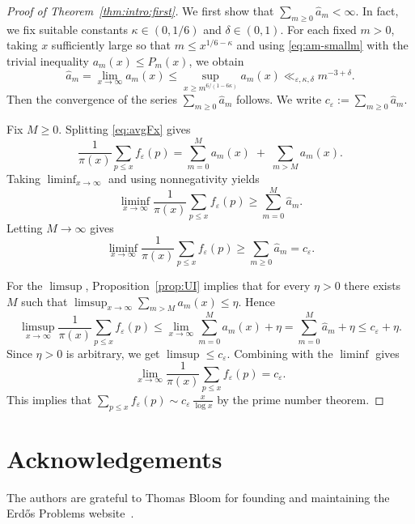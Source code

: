\documentclass[11pt,letterpaper,reqno]{amsart}
\theoremstyle{definition}
\numberwithin{equation}{section}
\newcommand{\eps}{\varepsilon}
\newcommand{\1}{\mathbf{1}}
\begin{document}
\begin{proof}[Proof of Theorem~\ref{thm:intro:first}]
We first show that $\sum_{m\ge 0} \widehat{a}_m<\infty$. In fact, we fix suitable constants $\kappa\in(0,1/6)$ and $\delta\in(0,1)$. For each fixed $m>0$, taking $x$ sufficiently large so that
$m\le x^{1/6-\kappa}$ and using \eqref{eq:am-smallm} with the trivial inequality $a_m(x)\leq P_m(x)$, we obtain
\[
\widehat{a}_m=\lim_{x\to\infty}a_m(x)\le \sup_{x\ge m^{6/(1-6\kappa)}} a_m(x)\ll_{\eps,\kappa,\delta} m^{-3+\delta}.
\]
Then the convergence of the series $\sum_{m\ge 0} \widehat{a}_m$ follows. We write $c_\eps :=\sum_{m\ge 0} \widehat{a}_m$.


Fix $M\ge 0$. Splitting \eqref{eq:avgFx} gives
\[
\frac{1}{\pi(x)}\sum_{p\le x} f_\eps(p)=\sum_{m=0}^{M} a_m(x)\;+\;\sum_{m>M} a_m(x).
\]
Taking $\liminf_{x\to\infty}$ and using nonnegativity yields
\[
\liminf_{x\to\infty}\frac{1}{\pi(x)}\sum_{p\le x} f_\eps(p)\ge \sum_{m=0}^{M} \widehat{a}_m.
\]
Letting $M\to\infty$ gives
\[
\liminf_{x\to\infty}\frac{1}{\pi(x)}\sum_{p\le x} f_\eps(p)\ge \sum_{m\ge 0} \widehat{a}_m=c_\eps.
\]

For the $\limsup$, Proposition~\ref{prop:UI} implies that for every $\eta>0$ there exists $M$ such that
$\limsup_{x\to\infty}\sum_{m>M} a_m(x)\le \eta$. Hence
\[
\limsup_{x\to\infty}\frac{1}{\pi(x)}\sum_{p\le x} f_\eps(p)
\le \lim_{x\to\infty}\sum_{m=0}^{M} a_m(x)+\eta
= \sum_{m=0}^{M} \widehat{a}_m+\eta
\le c_\eps+\eta.
\]
Since $\eta>0$ is arbitrary, we get $\limsup\le c_\eps$. Combining with the $\liminf$ gives
\[
\lim_{x\to\infty}\frac{1}{\pi(x)}\sum_{p\le x} f_\eps(p)=c_{\varepsilon}.
\]
This implies that $\sum_{p\le x} f_\eps(p)\sim c_\eps\,\frac{x}{\log x}$ by the prime number theorem.
\end{proof}




\section*{Acknowledgements}
The authors are grateful to Thomas Bloom for founding and maintaining the Erd\H{o}s Problems website~\cite{EP981}.
\end{document}
